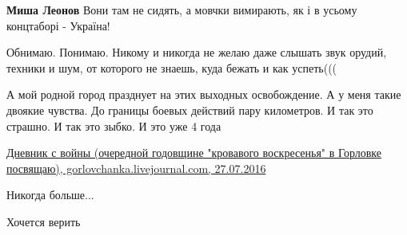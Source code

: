 \begin{itemize}
\begin{itemize}
 
\textbf{Миша Леонов} Вони там не сидять, а мовчки вимирають, як і в усьому концтаборі - Україна!

\end{itemize}

 

Обнимаю. Понимаю. Никому и никогда не желаю даже слышать звук орудий, техники и
шум, от которого не знаешь, куда бежать и как успеть(((

А мой родной город празднует на этих выходных освобождение. А у меня такие
двоякие чувства. До границы боевых действий пару километров. И так это страшно.
И так это зыбко. И это уже 4 года

\href{https://gorlovchanka.livejournal.com/1178.html}{%
Дневник с войны (очередной годовщине "кровавого воскресенья" в Горловке посвящаю), %
gorlovchanka.livejournal.com, 27.07.2016%
}

 
Никогда больше...

\begin{itemize}
 
Хочется верить
\end{itemize}

 

\end{itemize}
